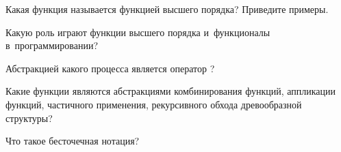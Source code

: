 \begin{Queeze}

\item Какая функция называется функцией высшего порядка? Приведите примеры.

 \item Какую роль играют функции высшего порядка и~функционалы в~программировании?

 \item Абстракцией какого процесса является оператор ?

 \item Какие функции являются абстракциями комбинирования функций, аппликации функций, частичного применения, рекурсивного обхода древообразной структуры?

 \item Что такое бесточечная нотация?

\end{Queeze}

